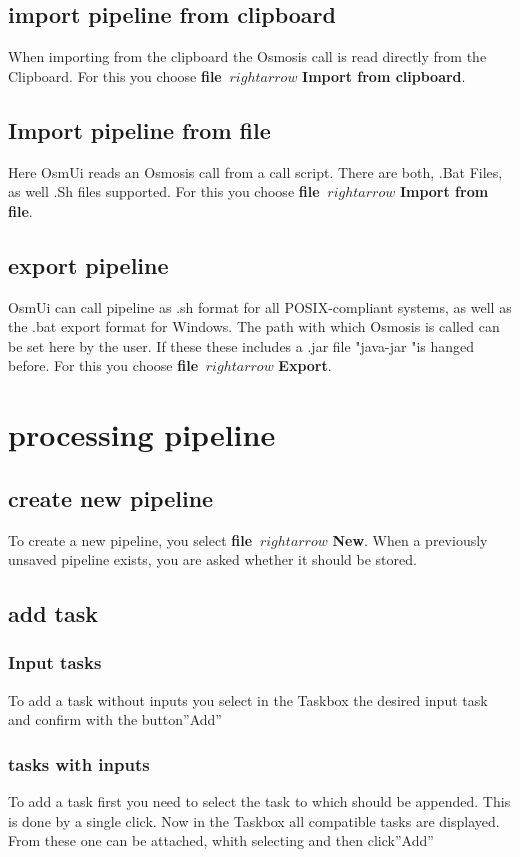 \documentclass[a4paper,10pt]{scrartcl}
\begin{document}
\subsection {import pipeline from clipboard}
When importing from the clipboard the Osmosis call is read directly from the
Clipboard. For this you choose \textbf {file} $ \ rightarrow $ \textbf { Import from clipboard}.
\subsection {Import pipeline from file}
Here OsmUi reads an Osmosis call from a call script. There are both, .Bat
Files, as well .Sh files supported. For this you choose \textbf {file} $ \ rightarrow $ \textbf {Import from file}.
\subsection {export pipeline}
OsmUi can call pipeline as .sh format for all POSIX-compliant systems, as well as the .bat export format for Windows. The path with which Osmosis is called can be set here by the user. If these these includes a .jar file "java-jar "is hanged before. For this you choose \textbf {file} $ \ rightarrow $ \textbf{Export}.


\section {processing pipeline}
\subsection {create new pipeline}
To create a new pipeline, you select \textbf {file} $ \ rightarrow $ \textbf {New}. When a previously unsaved pipeline exists, you are asked whether it should be stored.
\subsection {add task}
\subsubsection {Input tasks}
To add a task without inputs you select in the Taskbox the desired input task and confirm with the button''Add''
\subsubsection {tasks with inputs}
To add a task first you need to select the task to which should be appended. This is done by a single click. Now in the Taskbox all compatible tasks are displayed. From these one can be attached, whith selecting and then click''Add''
\end{document}
